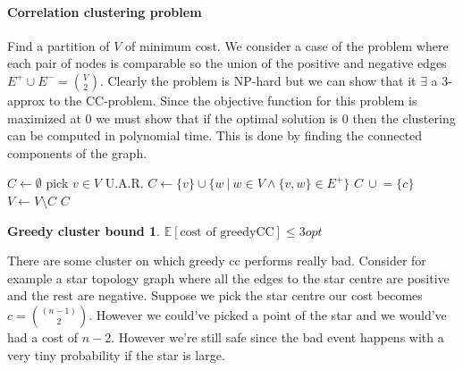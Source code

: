 \documentclass[]{article}
\begin{document}
\paragraph{Correlation clustering problem} Find a partition of $ V $ of minimum cost. We consider a case of the problem where each pair of nodes is comparable so the union of the positive and negative edges $ E^+ \cup E^- = {V \choose 2} $. Clearly the problem is NP-hard but we can show that it $ \exists $ a 3-approx to the CC-problem. Since the objective function for this problem is maximized at 0 we must show that if the optimal solution is 0 then the clustering can be computed in polynomial time. This is done by finding the connected components of the graph.


\begin{algorithm}[H]
	\caption{Greedy-Clustering(graph: G)}
	\label{alg:g-clustering}
	\begin{algorithmic}
		\STATE $C \leftarrow \emptyset $
		\STATE pick $ v \in V $ U.A.R.
		\STATE$ C \leftarrow \{v\} \cup \{w\ |\ w \in V \wedge \{v, w\}\in E^+ \}$
		\STATE $C\ \cup\! = \{c\} $
		\STATE $V \leftarrow V \setminus C  $
		\ENDWHILE
		\RETURN $ C $
	\end{algorithmic}
\end{algorithm}

\newtheorem{clusterbound}{Greedy cluster bound}
\begin{clusterbound}
	$ \mathbb{E}[\text{cost of greedyCC}] \leq 3opt $
\end{clusterbound}

There are some cluster on which greedy cc performs really bad. Consider for example a star topology graph where all the edges to the star centre are positive and the rest are negative. Suppose we pick the star centre our cost becomes $ c = {(n-1) \choose 2} $. However we could've picked a point of the star and we would've had a cost of $ n-2 $. However we're still safe since the bad event happens with a very tiny probability if the star is large.
\end{document}
